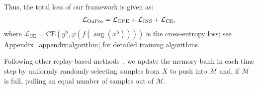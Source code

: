 Thus, the total loss of our \frameworkName framework is given as:
\begin{align}
    \mathcal{L}_{\mathrm{OnPro}}=\mathcal{L}_{\mathrm{OPE}} + \mathcal{L}_{\mathrm{INS}} + \mathcal{L}_{\mathrm{CE}},
\end{align}
where $\mathcal{L}_{\mathrm{CE}} = \mathrm{CE}(y^\mathrm{b}, \varphi(f(\operatorname{aug}(x^\mathrm{b}))))$ is the cross-entropy loss; see Appendix~\ref{appendix:algorithm} for detailed training algorithms.

Following other replay-based methods~\cite{ER, SCR, OCM}, we update the memory bank in each time step by uniformly randomly selecting samples from $X$ to push into $\mathcal{M}$ and, if $\mathcal{M}$ is full, pulling an equal number of samples out of $\mathcal{M}$.
